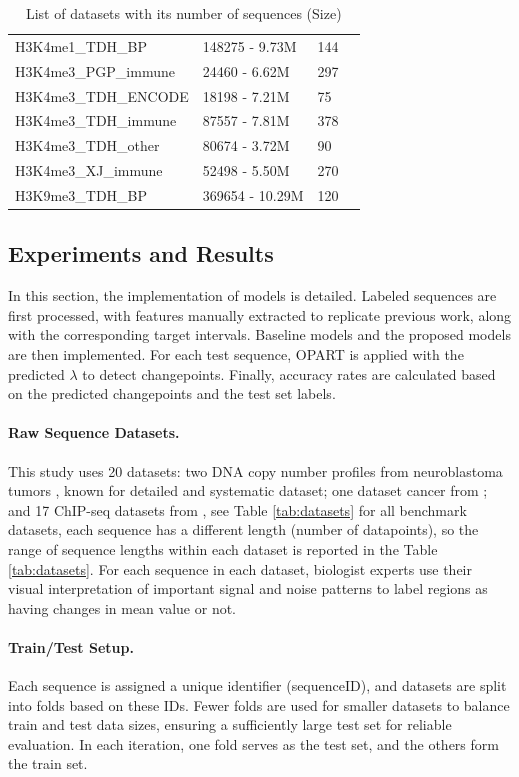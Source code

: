 \documentclass[12pt]{article}
\begin{document}
\begin{table}[t]
\begin{tabular}{@{}lll|l@{}}
H3K4me1\_TDH\_BP & 148275 -\phantom{0} 9.73M & \phantom{0}144 \\
H3K4me3\_PGP\_immune & \phantom{0}24460 -\phantom{0} 6.62M & \phantom{0}297 \\
H3K4me3\_TDH\_ENCODE & \phantom{0}18198 -\phantom{0} 7.21M & \phantom{00}75 \\
H3K4me3\_TDH\_immune & \phantom{0}87557 -\phantom{0} 7.81M & \phantom{0}378 \\
H3K4me3\_TDH\_other & \phantom{0}80674 -\phantom{0} 3.72M & \phantom{00}90 \\
H3K4me3\_XJ\_immune & \phantom{0}52498 -\phantom{0} 5.50M & \phantom{0}270 \\
H3K9me3\_TDH\_BP & 369654 - 10.29M & \phantom{0}120 \\
\bottomrule
\end{tabular}
\caption{List of datasets with its number of sequences (Size)}
\end{table}

\subsection{Experiments and Results}
In this section, the implementation of models is detailed. 
Labeled sequences are first processed, with features manually extracted to replicate previous work, along with the corresponding target intervals. 
Baseline models and the proposed models are then implemented. 
For each test sequence, OPART is applied with the predicted $\lambda$ to detect changepoints. 
Finally, accuracy rates are calculated based on the predicted changepoints and the test set labels.


\paragraph{Raw Sequence Datasets.}  
This study uses 20 datasets: two DNA copy number profiles from neuroblastoma tumors \citep{rigaill:13}, known for detailed and systematic dataset; one dataset cancer from \citep{lopart}; and 17 ChIP-seq datasets from \citep{hocking_peak16}, see Table \ref{tab:datasets} for all benchmark datasets, each sequence has a different length (number of datapoints), so the range of sequence lengths within each dataset is reported in the Table \ref{tab:datasets}.
For each sequence in each dataset, biologist experts use their visual interpretation of important signal and noise patterns to label regions as having changes in mean value or not.

\paragraph{Train/Test Setup.}  
Each sequence is assigned a unique identifier (sequenceID), and datasets are split into folds based on these IDs. Fewer folds are used for smaller datasets to balance train and test data sizes, ensuring a sufficiently large test set for reliable evaluation. In each iteration, one fold serves as the test set, and the others form the train set.
\end{document}
